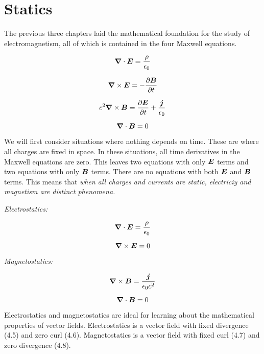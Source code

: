 \section{Statics}

The previous three chapters laid the mathematical foundation
for the study of electromagnetism, all of which is contained 
in the four Maxwell equations.

\begin{equation}
  \boldsymbol{\nabla} \cdot \boldsymbol{E} = \frac{\rho}{\epsilon_0}
\end{equation}

\begin{equation}
  \boldsymbol{\nabla} \times \boldsymbol{E} = - \frac{\partial \boldsymbol{B}}{\partial t}
\end{equation}

\begin{equation}
  c^2 \boldsymbol{\nabla} \times \boldsymbol{B} = \frac{\partial \boldsymbol{E}}{\partial t} + \frac{\boldsymbol{j}}{\epsilon_0}
\end{equation}

\begin{equation}
  \boldsymbol{\nabla} \cdot \boldsymbol{B} = 0
\end{equation}

\vspace{2em}
We will first consider situations where nothing depends on time.
These are where all charges are fixed in space.
In these situations, all time derivatives in the Maxwell equations are zero.
This leaves two equations with only $\boldsymbol{E}$ terms
and two equations with only $\boldsymbol{B}$ terms.
There are no equations with both $\boldsymbol{E}$ and $\boldsymbol{B}$ terms.
This means that \emph{when all charges and currents are static,
electriciy and magnetism are distinct phenomena.}

\emph{Electrostatics:} 

\begin{equation}
  \boldsymbol{\nabla} \cdot \boldsymbol{E} = \frac{\rho}{\epsilon_0}
\end{equation}

\begin{equation}
  \boldsymbol{\nabla} \times \boldsymbol{E} = 0
\end{equation}

\emph{Magnetostatics:} 

\begin{equation}
  \boldsymbol{\nabla} \times \boldsymbol{B} = \frac{\boldsymbol{j}}{\epsilon_0 c^2}
\end{equation}

\begin{equation}
  \boldsymbol{\nabla} \cdot \boldsymbol{B} = 0
\end{equation}

Electrostatics and magnetostatics are ideal for learning about 
the mathematical properties of vector fields.
Electrostatics is a vector field with fixed divergence (4.5) and zero curl (4.6).
Magnetostatics is a vector field with fixed curl (4.7) and zero divergence (4.8).

